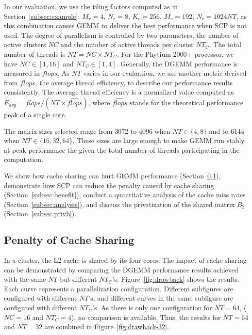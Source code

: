 In our evaluation, we use the tiling factors
computed as in Section~\ref{subsec:example}:
$M_r = 4$, $N_r = 8$, $K_c = 256$, $M_c = 192$, $N_c = 1024NT$,
as this combination causes GEMM to deliver the best performance 
when SCP is not used.
The degree of parallelism is controlled by two parameters,
the number of active clusters $NC$
and the number of active threads per cluster $NT_C$.
The total number of threads is $NT = NC \times NT_C$.
For the Phytium 2000+ processor, we have
$NC \in [1, 16]$ and $NT_C \in [1, 4]$. 
Generally, the DGEMM performance is measured in $flops$.
As $NT$ varies in our evaluation,
we use another metric derived from $flops$,
the average thread efficiency,
to describe our performance results consistently.
The average thread efficiency is a normalized value computed as
$E_{avg} = flops / (NT \times \widehat{flops})$,
where $\widehat{flops}$ stands for the theoretical performance
peak of a single core.

The mairix sizes selected range from 3072 to 
4096 when $NT \in \{4, 8\}$ and to 
6144 when $NT \in \{16, 32, 64\}$. 
These sizes are large enough to make GEMM run stably at peak performance
the given the total number of threads participating in the computation.

We show how cache sharing can hurt GEMM performance
(Section~\ref{subsec:drawback}),
demonstrate how SCP can reduce
the penalty caused by cache sharing 
(Section~\ref{subsec:benefit}), conduct a 
quantitative analysis of the cache miss rates
(Section~\ref{subsec:analysis}), and
discuss the privatization of the shared matrix $B_2$
(Section~\ref{subsec:privb}).

\subsection{Penalty of Cache Sharing}\label{subsec:drawback}

In a cluster, the L2 cache is shared by its four cores.
The impact of cache sharing can be demonstrated
by comparing the DGEMM performance results achieved
with the same $NT$
but different $NT_C$'s.
Figure~\ref{fig:drawback} shows the results.
Each curve represents a parallelization configuration.
Different subfigures are configured with different $NT$'s,
and different curves in the same subfigure are
configured with different $NT_C$'s.
As there is only one configuration for $NT=64$,
($NC=16$ and $NT_C=4$),
no comparison is available. Thus,
the results for $NT=64$ and $NT=32$ are combined in Figure~\ref{fig:drawback-32}.

